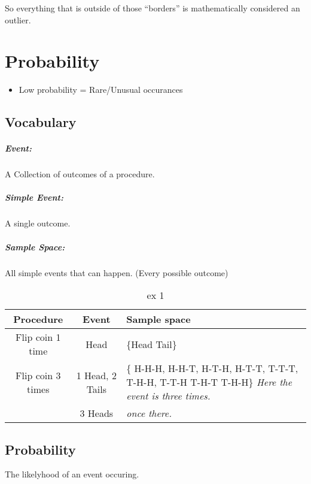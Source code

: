 So everything that is outside of those ``borders'' is mathematically considered an outlier.




\chapter{Probability}

\begin{itemize}
    \item Low probability = Rare/Unusual occurances
\end{itemize}

\section{Vocabulary}
\paragraph{Event:} A Collection of outcomes of a procedure.
\paragraph{Simple Event:} A single outcome.
\paragraph{Sample Space:} All simple events that can happen. (Every possible outcome)

\begin{table}[htbp]
    \centering
    \begin{tabular}{c|c|p{4cm}}
        \toprule
        Procedure & Event & Sample space \\ 
        \midrule
        Flip coin 1 time & Head & \{Head Tail\} \\
        \midrule
        Flip coin 3 times & 1 Head, 2 Tails & 
        \{ H-H-H, H-H-T, H-T-H, H-T-T, T-T-T, T-H-H, T-T-H T-H-T T-H-H\} \textit{Here the event is three times.} \\
                          & 3 Heads & \textit{once there.}\\
                          \bottomrule
    \end{tabular}
    \caption{ex 1}
\end{table}


\section{Probability}
The likelyhood of an event occuring.

